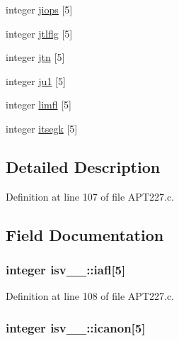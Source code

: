 \begin{DoxyCompactItemize}
\item 
integer \hyperlink{structisv__1___ac0f8f87d42758b3b0beccd10d9705482}{jiops} \mbox{[}5\mbox{]}
\item 
integer \hyperlink{structisv__1___a77ebe76cd5878ca050835bdb62479f7c}{jtlflg} \mbox{[}5\mbox{]}
\item 
integer \hyperlink{structisv__1___a66b5b3eec6b7ea801a28a0e88a7b594b}{jtn} \mbox{[}5\mbox{]}
\item 
integer \hyperlink{structisv__1___a443c1899c30db617c5b6c44ca58bf9e6}{ju1} \mbox{[}5\mbox{]}
\item 
integer \hyperlink{structisv__1___ac45ae21b619df183c8845fcc1746d371}{limfl} \mbox{[}5\mbox{]}
\item 
integer \hyperlink{structisv__1___a0e65196a19942a2f5b9b70aa3361f2ba}{itsegk} \mbox{[}5\mbox{]}
\end{DoxyCompactItemize}


\subsection{Detailed Description}


Definition at line 107 of file A\+P\+T227.\+c.



\subsection{Field Documentation}
\subsubsection[{\texorpdfstring{iafl}{iafl}}]{\setlength{\rightskip}{0pt plus 5cm}integer isv\+\_\+\_\+\+::iafl\mbox{[}5\mbox{]}}\hypertarget{structisv__1___a110053f41da17aeb74e0c20eb537925b}{}\label{structisv__1___a110053f41da17aeb74e0c20eb537925b}


Definition at line 108 of file A\+P\+T227.\+c.

\subsubsection[{\texorpdfstring{icanon}{icanon}}]{\setlength{\rightskip}{0pt plus 5cm}integer isv\+\_\+\_\+\+::icanon\mbox{[}5\mbox{]}}\hypertarget{structisv__1___a60c852ae9ab4f41da8422a78bd2e3ddf}{}\label{structisv__1___a60c852ae9ab4f41da8422a78bd2e3ddf}


